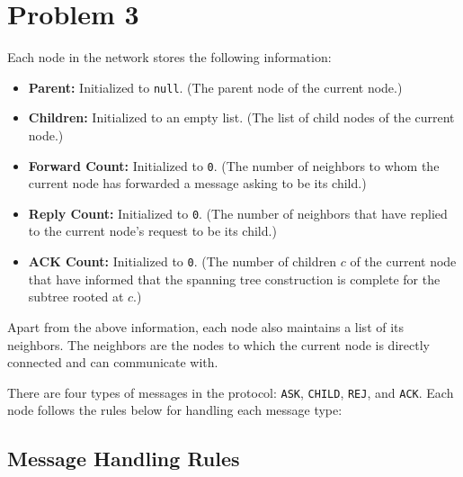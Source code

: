 \section{Problem 3}\label{prob3}

Each node in the network stores the following information:
\begin{itemize}
    \item \textbf{Parent:} Initialized to \texttt{null}. (The parent node of the current node.)
    \item \textbf{Children:} Initialized to an empty list. (The list of child nodes of the current node.)
    \item \textbf{Forward Count:} Initialized to \texttt{0}. (The number of neighbors to whom the current node has forwarded a message asking to be its child.)
    \item \textbf{Reply Count:} Initialized to \texttt{0}. (The number of neighbors that have replied to the current node's request to be its child.)
    \item \textbf{ACK Count:} Initialized to \texttt{0}. (The number of children \(c\) of the current node that have informed that the spanning tree construction is complete for the subtree rooted at \(c\).)
\end{itemize}

Apart from the above information, each node also maintains a list of its neighbors. The neighbors are the nodes to which the current node is directly connected and can communicate with.

There are four types of messages in the protocol: \texttt{ASK}, \texttt{CHILD}, \texttt{REJ}, and \texttt{ACK}. Each node follows the rules below for handling each message type:

\subsection{Message Handling Rules}

